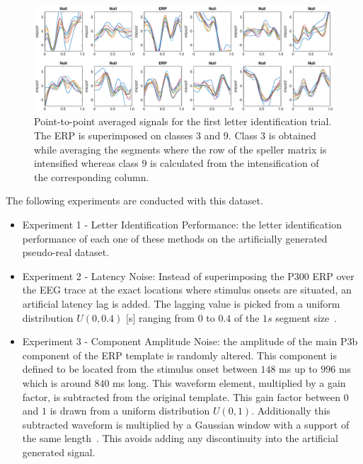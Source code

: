 \begin{figure}[h!]
\centering
\includegraphics[width=1.0\linewidth]{images/GainCheck.eps}
\caption[P300 Averaged Segments for a single-intensification sequence]{Point-to-point averaged signals for the first letter identification trial.  The ERP is superimposed on classes 3 and 9.  Class 3 is obtained while averaging the segments where the row of the speller matrix is intensified whereas class 9 is calculated from the intensification of the corresponding column.}
\label{fig:gaincheck}
\end{figure}

\vspace{5pt}

The following experiments are conducted with this dataset.

\begin{itemize}
\item Experiment 1 - Letter Identification Performance: the letter identification performance of each one of these methods on the artificially generated pseudo-real dataset.
\item Experiment 2 - Latency Noise:  Instead of superimposing the P300 ERP over the EEG trace at the exact locations where stimulus onsets are situated, an artificial latency lag is added.  The lagging value is picked from a uniform distribution $U(0,0.4)$ [s] ranging from $0$ to $0.4$ of the $1s$ segment size~\cite{DaPelo2018}.
\item Experiment 3 - Component Amplitude Noise: the amplitude of the main P3b component of the ERP template is randomly altered.  This component is defined to be located from the stimulus onset between $148$ ms up to $996$ ms which is around $840$ ms long.  This waveform element, multiplied by a gain factor, is subtracted from the original template.  This gain factor between $0$ and $1$ is drawn from a uniform distribution $U(0,1)$.  Additionally this subtracted waveform is multiplied by a Gaussian window with a support of the same length~\cite{Harris1978}.  This avoids adding any discontinuity into the artificial generated signal.
\end{itemize}

